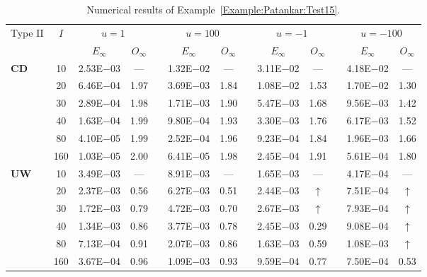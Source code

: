 {\renewcommand{\baselinestretch}{1.0}
\begin{table}[H]
\caption{Numerical results of Example~\ref{Example:Patankar:Test15}.}

\footnotesize
\centering
\begin{tabular}{@{}l c c c c c c c c c c c c@{}}
\toprule
\multirow{2}{*}{Type II} & \multirow{2}{*}{$I$} & \multicolumn{2}{c}{$u=1$} & \multicolumn{1}{c}{} & \multicolumn{2}{c}{$u=100$} & \multicolumn{1}{c}{} & \multicolumn{2}{c}{$u=-1$} & \multicolumn{1}{c}{} & \multicolumn{2}{c}{$u=-100$}\\
\cline{3-4}
\cline{6-7}
\cline{9-10}
\cline{12-13}
&  & \multicolumn{1}{c}{$E_{\infty}$} & \multicolumn{1}{c}{$O_{\infty}$} & \multicolumn{1}{c}{} & \multicolumn{1}{c}{$E_{\infty}$} & \multicolumn{1}{c}{$O_{\infty}$} & \multicolumn{1}{c}{} & \multicolumn{1}{c}{$E_{\infty}$} & \multicolumn{1}{c}{$O_{\infty}$} & \multicolumn{1}{c}{} & \multicolumn{1}{c}{$E_{\infty}$} & \multicolumn{1}{c}{$O_{\infty}$}\\
\midrule
\multirow{6}{*}{\textbf{CD}}
& 10 & 2.53E$-$03 & --- &  & 1.32E$-$02 & --- &  & 3.11E$-$02 & --- &  & 4.18E$-$02 & ---\\
& 20 & 6.46E$-$04 & 1.97 &  & 3.69E$-$03 & 1.84 &  & 1.08E$-$02 & 1.53 &  & 1.70E$-$02 & 1.30\\
& 30 & 2.89E$-$04 & 1.98 &  & 1.71E$-$03 & 1.90 &  & 5.47E$-$03 & 1.68 &  & 9.56E$-$03 & 1.42\\
& 40 & 1.63E$-$04 & 1.99 &  & 9.80E$-$04 & 1.93 &  & 3.30E$-$03 & 1.76 &  & 6.17E$-$03 & 1.52\\
& 80 & 4.10E$-$05 & 1.99 &  & 2.52E$-$04 & 1.96 &  & 9.23E$-$04 & 1.84 &  & 1.96E$-$03 & 1.66\\
& 160 & 1.03E$-$05 & 2.00 &  & 6.41E$-$05 & 1.98 &  & 2.45E$-$04 & 1.91 &  & 5.61E$-$04 & 1.80\\
\midrule
\multirow{6}{*}{\textbf{UW}}
& 10 & 3.49E$-$03 & --- &  & 8.91E$-$03 & --- &  & 1.65E$-$03 & --- &  & 4.17E$-$04 & ---\\
& 20 & 2.37E$-$03 & 0.56 &  & 6.27E$-$03 & 0.51 &  & 2.44E$-$03 & $\uparrow$ &  & 7.51E$-$04 & $\uparrow$\\
& 30 & 1.72E$-$03 & 0.79 &  & 4.72E$-$03 & 0.70 &  & 2.67E$-$03 & $\uparrow$ &  & 7.93E$-$04 & $\uparrow$\\
& 40 & 1.34E$-$03 & 0.86 &  & 3.77E$-$03 & 0.78 &  & 2.45E$-$03 & 0.29 &  & 9.08E$-$04 & $\uparrow$\\
& 80 & 7.13E$-$04 & 0.91 &  & 2.07E$-$03 & 0.86 &  & 1.63E$-$03 & 0.59 &  & 1.08E$-$03 & $\uparrow$\\
& 160 & 3.67E$-$04 & 0.96 &  & 1.09E$-$03 & 0.93 &  & 9.59E$-$04 & 0.77 &  & 7.50E$-$04 & 0.53\\
\bottomrule
\end{tabular}
\label{Table:Patankar:Test15}
\end{table}}
